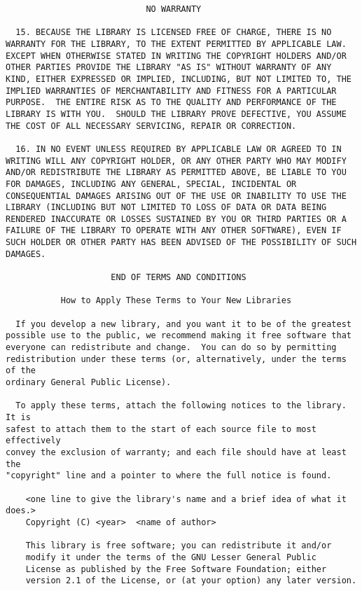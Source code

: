 \documentclass{InsightBook}
\begin{document}
\begin{verbatim}
                            NO WARRANTY

  15. BECAUSE THE LIBRARY IS LICENSED FREE OF CHARGE, THERE IS NO
WARRANTY FOR THE LIBRARY, TO THE EXTENT PERMITTED BY APPLICABLE LAW.
EXCEPT WHEN OTHERWISE STATED IN WRITING THE COPYRIGHT HOLDERS AND/OR
OTHER PARTIES PROVIDE THE LIBRARY "AS IS" WITHOUT WARRANTY OF ANY
KIND, EITHER EXPRESSED OR IMPLIED, INCLUDING, BUT NOT LIMITED TO, THE
IMPLIED WARRANTIES OF MERCHANTABILITY AND FITNESS FOR A PARTICULAR
PURPOSE.  THE ENTIRE RISK AS TO THE QUALITY AND PERFORMANCE OF THE
LIBRARY IS WITH YOU.  SHOULD THE LIBRARY PROVE DEFECTIVE, YOU ASSUME
THE COST OF ALL NECESSARY SERVICING, REPAIR OR CORRECTION.

  16. IN NO EVENT UNLESS REQUIRED BY APPLICABLE LAW OR AGREED TO IN
WRITING WILL ANY COPYRIGHT HOLDER, OR ANY OTHER PARTY WHO MAY MODIFY
AND/OR REDISTRIBUTE THE LIBRARY AS PERMITTED ABOVE, BE LIABLE TO YOU
FOR DAMAGES, INCLUDING ANY GENERAL, SPECIAL, INCIDENTAL OR
CONSEQUENTIAL DAMAGES ARISING OUT OF THE USE OR INABILITY TO USE THE
LIBRARY (INCLUDING BUT NOT LIMITED TO LOSS OF DATA OR DATA BEING
RENDERED INACCURATE OR LOSSES SUSTAINED BY YOU OR THIRD PARTIES OR A
FAILURE OF THE LIBRARY TO OPERATE WITH ANY OTHER SOFTWARE), EVEN IF
SUCH HOLDER OR OTHER PARTY HAS BEEN ADVISED OF THE POSSIBILITY OF SUCH
DAMAGES.

                     END OF TERMS AND CONDITIONS

           How to Apply These Terms to Your New Libraries

  If you develop a new library, and you want it to be of the greatest
possible use to the public, we recommend making it free software that
everyone can redistribute and change.  You can do so by permitting
redistribution under these terms (or, alternatively, under the terms of the
ordinary General Public License).

  To apply these terms, attach the following notices to the library.  It is
safest to attach them to the start of each source file to most effectively
convey the exclusion of warranty; and each file should have at least the
"copyright" line and a pointer to where the full notice is found.

    <one line to give the library's name and a brief idea of what it does.>
    Copyright (C) <year>  <name of author>

    This library is free software; you can redistribute it and/or
    modify it under the terms of the GNU Lesser General Public
    License as published by the Free Software Foundation; either
    version 2.1 of the License, or (at your option) any later version.


\end{verbatim}
\end{document}
